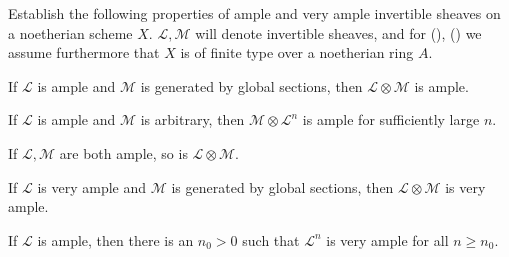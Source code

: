 {{\begin{description}[style=multiline,labelwidth=1.8em,leftmargin=2.1em,itemsep=4pt,topsep=2pt,parsep=0pt]
\begin{parts}
\end{parts}
\item[\hypertarget{ex-II-7.5}{}7.5.] Establish the following properties of ample and very ample invertible sheaves on a noetherian scheme $X$. $\mathcal L,\mathcal M$ will denote invertible sheaves, and for (), () we assume furthermore that $X$ is of finite type over a noetherian ring $A$.
\begin{parts}
\item[\hypertarget{ex-II-7.5a}{}(a)] If $\mathcal L$ is ample and $\mathcal M$ is generated by global sections, then $\mathcal L\otimes\mathcal M$ is ample.
\item[\hypertarget{ex-II-7.5b}{}(b)] If $\mathcal L$ is ample and $\mathcal M$ is arbitrary, then $\mathcal M\otimes\mathcal L^n$ is ample for sufficiently large $n$.
\item[\hypertarget{ex-II-7.5c}{}(c)] If $\mathcal L,\mathcal M$ are both ample, so is $\mathcal L\otimes\mathcal M$.
\item[\hypertarget{ex-II-7.5d}{}(d)] If $\mathcal L$ is very ample and $\mathcal M$ is generated by global sections, then $\mathcal L\otimes\mathcal M$ is very ample.
\item[\hypertarget{ex-II-7.5e}{}(e)] If $\mathcal L$ is ample, then there is an $n_0>0$ such that $\mathcal L^n$ is very ample for all $n\ge n_0$.
\end{parts}
\end{description}
}
}
